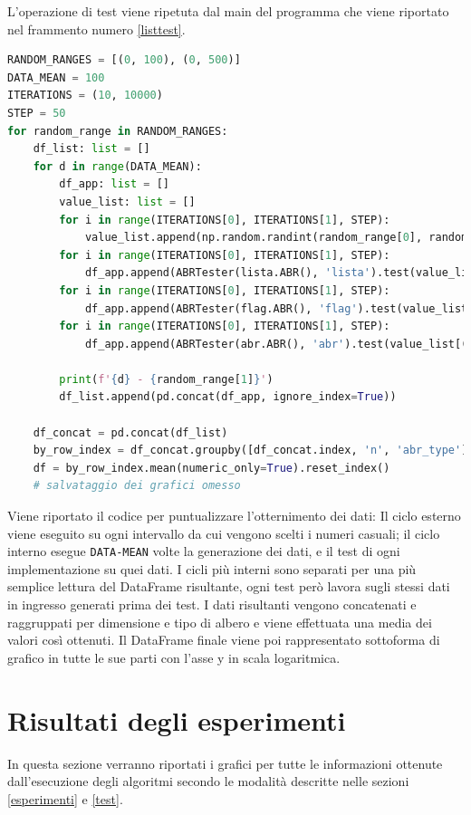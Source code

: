\documentclass{article}
\begin{document}
L'operazione di test viene ripetuta dal main del programma che viene riportato nel frammento numero \ref{listtest}.

\begin{lstlisting}[language=Python, caption={Algoritmo di test}, label=listtest]
RANDOM_RANGES = [(0, 100), (0, 500)]
DATA_MEAN = 100
ITERATIONS = (10, 10000)
STEP = 50
for random_range in RANDOM_RANGES:
    df_list: list = []
    for d in range(DATA_MEAN):
        df_app: list = []
        value_list: list = []
        for i in range(ITERATIONS[0], ITERATIONS[1], STEP):
            value_list.append(np.random.randint(random_range[0], random_range[1], i))
        for i in range(ITERATIONS[0], ITERATIONS[1], STEP):
            df_app.append(ABRTester(lista.ABR(), 'lista').test(value_list[(i - ITERATIONS[0]) // STEP]))
        for i in range(ITERATIONS[0], ITERATIONS[1], STEP):
            df_app.append(ABRTester(flag.ABR(), 'flag').test(value_list[(i - ITERATIONS[0]) // STEP]))
        for i in range(ITERATIONS[0], ITERATIONS[1], STEP):
            df_app.append(ABRTester(abr.ABR(), 'abr').test(value_list[(i - ITERATIONS[0]) // STEP]))

        print(f'{d} - {random_range[1]}')
        df_list.append(pd.concat(df_app, ignore_index=True))

    df_concat = pd.concat(df_list)
    by_row_index = df_concat.groupby([df_concat.index, 'n', 'abr_type'])
    df = by_row_index.mean(numeric_only=True).reset_index()
    # salvataggio dei grafici omesso
\end{lstlisting}
Viene riportato il codice per puntualizzare l'otternimento dei dati:
Il ciclo esterno viene eseguito su ogni intervallo da cui vengono scelti i numeri casuali;
il ciclo interno esegue \verb|DATA-MEAN| volte la generazione dei dati, e il test di ogni implementazione su quei dati. I cicli più interni sono separati per una più semplice lettura del DataFrame risultante, ogni test però lavora sugli stessi dati in ingresso generati prima dei test.
I dati risultanti vengono concatenati e raggruppati per dimensione e tipo di albero e viene effettuata una media dei valori così ottenuti. Il DataFrame finale viene poi rappresentato sottoforma di grafico in tutte le sue parti con l'asse y in scala logaritmica.
\section{Risultati degli esperimenti}
In questa sezione verranno riportati i grafici per tutte le informazioni ottenute dall'esecuzione degli algoritmi secondo le modalità descritte nelle sezioni \ref{esperimenti} e \ref{test}.
\end{document}
